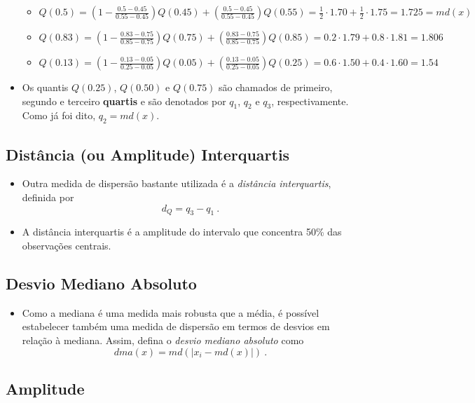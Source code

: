 \documentclass[
]{book}
\providecommand{\tightlist}{%
  \setlength{\itemsep}{0pt}\setlength{\parskip}{0pt}}
\begin{document}
\begin{itemize}
  \begin{itemize}
  \tightlist
  \item
    \(Q(0.5) = \left(1-\frac{0.5-0.45}{0.55-0.45}\right)Q(0.45)+\left(\frac{0.5-0.45}{0.55-0.45}\right)Q(0.55)=\frac{1}{2}\cdot 1.70 + \frac{1}{2}\cdot 1.75 = 1.725 = md(x)\)
  \item
    \(Q(0.83) = \left(1-\frac{0.83-0.75}{0.85-0.75}\right)Q(0.75)+\left(\frac{0.83-0.75}{0.85-0.75}\right)Q(0.85)=0.2\cdot 1.79 + 0.8\cdot 1.81 = 1.806\)
  \item
    \(Q(0.13) = \left(1-\frac{0.13-0.05}{0.25-0.05}\right)Q(0.05)+\left(\frac{0.13-0.05}{0.25-0.05}\right)Q(0.25)=0.6\cdot 1.50 + 0.4\cdot 1.60 = 1.54\)
  \end{itemize}
\item
  Os quantis \(Q(0.25)\), \(Q(0.50)\) e \(Q(0.75)\) são chamados de primeiro, segundo e terceiro \textbf{quartis} e são denotados por \(q_1\), \(q_2\) e \(q_3\), respectivamente. Como já foi dito, \(q_2 = md(x)\).
\end{itemize}

\subsection{Distância (ou Amplitude) Interquartis}\label{distuxe2ncia-ou-amplitude-interquartis}

\begin{itemize}
\tightlist
\item
  Outra medida de dispersão bastante utilizada é a \emph{distância interquartis}, definida por \[d_Q = q_3 - q_1~.\]
\item
  A distância interquartis é a amplitude do intervalo que concentra 50\% das observações centrais.
\end{itemize}

\subsection{Desvio Mediano Absoluto}\label{desvio-mediano-absoluto}

\begin{itemize}
\tightlist
\item
  Como a mediana é uma medida mais robusta que a média, é possível estabelecer também uma medida de dispersão em termos de desvios em relação à mediana. Assim, defina o \emph{desvio mediano absoluto} como \[dma(x) = md(|x_i - md(x)|)~.\]
\end{itemize}

\subsection{Amplitude}\label{amplitude}
\end{document}

